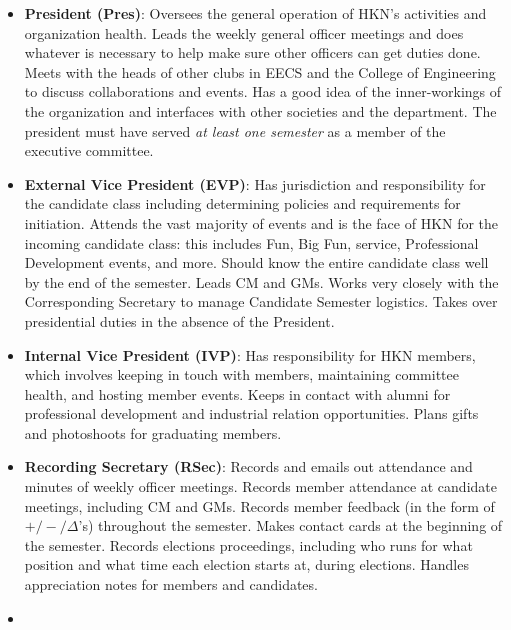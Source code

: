 \documentclass[11pt, article, oneside]{memoir}
\begin{document}
        \begin{itemize}
            \item
                \textbf{President (Pres)}: Oversees the general operation of HKN's activities and organization health.
                Leads the weekly general officer meetings and does whatever is necessary to help make sure other officers can get duties done.
                Meets with the heads of other clubs in EECS and the College of Engineering to discuss collaborations and events.
                Has a good idea of the inner-workings of the organization and interfaces with other societies and the department.
                The president must have served \emph{at least one semester} as a member of the executive committee.
            \item
                \textbf{External Vice President (EVP)}: Has jurisdiction and responsibility for the candidate class including determining policies and requirements for initiation.
                Attends the vast majority of events and is the face of HKN for the incoming candidate class: this includes Fun, Big Fun, service, Professional Development events, and more.
                Should know the entire candidate class well by the end of the semester.
                Leads CM and GMs.
                Works very closely with the Corresponding Secretary to manage Candidate Semester logistics.
                Takes over presidential duties in the absence of the President.
            \item
                \textbf{Internal Vice President (IVP)}: Has responsibility for HKN members, which involves keeping in touch with members, maintaining committee health, and hosting member events.
                Keeps in contact with alumni for professional development and industrial relation opportunities.
                Plans gifts and photoshoots for graduating members.
            \item
                \textbf{Recording Secretary (RSec)}: Records and emails out attendance and minutes of weekly officer meetings.
                Records member attendance at candidate meetings, including CM and GMs.
                Records member feedback (in the form of $+/-/\Delta$'s) throughout the semester.
                Makes contact cards at the beginning of the semester.
                Records elections proceedings, including who runs for what position and what time each election starts at, during elections.
                Handles appreciation notes for members and candidates.
            \item

\end{itemize}
\end{document}
